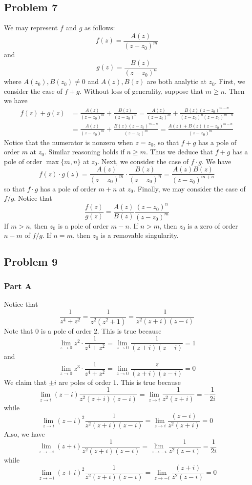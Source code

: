 \documentclass[12pt]{article}
\begin{document}
\subsection*{Problem 7}
We may represent $f$ and $g$ as follows:
\[
f(z) = \frac{A(z)}{(z-z_0)^m}
\] and
\[
g(z) = \frac{B(z)}{(z-z_0)^n}
\] where $A(z_0), B(z_0) \neq 0$ and $A(z),B(z)$ are both analytic at $z_0$. First, we consider the case of $f+g$. Without loss of generality, suppose that $m \geq n$. Then we have
\begin{align*}
f(z) + g(z) &= \frac{A(z)}{(z-z_0)^m} + \frac{B(z)}{(z-z_0)^n} = \frac{A(z)}{(z-z_0)^m} + \frac{B(z)(z-z_0)^{m-n}}{(z-z_0)^n(z-z_0)^{m-n}} \\
&= \frac{A(z)}{(z-z_0)^m} + \frac{B(z)(z-z_0)^{m-n}}{(z-z_0)^{m}} = \frac{A(z) + B(z)(z-z_0)^{m-n}}{(z-z_0)^m}
\end{align*} Notice that the numerator is nonzero when $z = z_0$, so that $f+g$ has a pole of order $m$ at $z_0$. Similar reasoning holds if $n \geq m$. Thus we deduce that $f+g$ has a pole of order $\max\{m,n\}$ at $z_0$. Next, we consider the case of $f \cdot g$. We have
\[
f(z) \cdot g(z) = \frac{A(z)}{(z-z_0)^m} \cdot \frac{B(z)}{(z-z_0)^n} =  \frac{A(z)B(z)}{(z-z_0)^{m+n}}
\] so that $f \cdot g$ has a pole of order $m+n$ at $z_0$. Finally, we may consider the case of $f/g$.
 Notice that
\[
\frac{f(z)}{g(z)} = \frac{A(z)}{B(z)} \frac{(z-z_0)^n}{(z-z_0)^m}
\] If $m > n$, then $z_0$ is a pole of order $m-n$. If $n > m$, then $z_0$ is a zero of order $n-m$ of $f/g$. If $n = m$, then $z_0$ is a removable singularity.
\newpage
\subsection*{Problem 9}
\subsubsection*{Part A}
Notice that
\[
\frac{1}{z^4+z^2} = \frac{1}{z^2(z^2+1)} = \frac{1}{z^2(z+i)(z-i)}
\] Note that $0$ is a pole of order $2$. This is true because
\[
\lim_{z \rightarrow 0} z^2 \cdot \frac{1}{z^4+z^2} = \lim_{z \rightarrow 0} \frac{1}{(z+i)(z-i)} = 1
\] and
\[
\lim_{z \rightarrow 0} z^3 \cdot \frac{1}{z^4+z^2} = \lim_{z \rightarrow 0} \frac{z}{(z+i)(z-i)} = 0
\] We claim that $\pm i$ are poles of order $1$. This is true because
\[
\lim_{z \rightarrow i} (z-i) \frac{1}{z^2(z+i)(z-i)} = \lim_{z \rightarrow i} \frac{1}{z^2(z+i)} = -\frac{1}{2i}
\] while
\[
\lim_{z \rightarrow i} (z-i)^2 \frac{1}{z^2(z+i)(z-i)} = \lim_{z \rightarrow i} \frac{(z-i)}{z^2(z+i)} = 0
\] Also, we have
\[ 
\lim_{z \rightarrow -i} (z+i) \frac{1}{z^2(z+i)(z-i)} = \lim_{z \rightarrow -i} \frac{1}{z^2(z-i)} = \frac{1}{2i}
\] while
\[
\lim_{z \rightarrow -i} (z+i)^2 \frac{1}{z^2(z+i)(z-i)} = \lim_{z \rightarrow -i} \frac{(z+i)}{z^2(z-i)} = 0
\]
\end{document}

